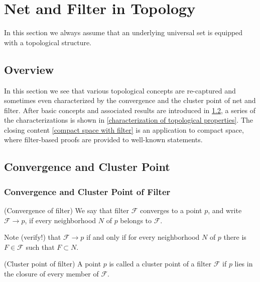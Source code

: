 \documentclass{report}
\begin{document}
\section{Net and Filter in Topology} \label{in topology}

In this section we always assume that an underlying universal set is equipped with a topological structure.

\subsection{Overview}
In this section we see that various topological concepts are re-captured and sometimes even characterized by the convergence and the cluster point of net and filter. After basic concepts  and associated results are introduced in \ref{convergence and cluster point}, a series of the characterizations is shown in \ref{characterization of topological properties}. The closing content \ref{compact space with filter} is an application to compact space, where filter-based proofs are provided to well-known statements.

\subsection{Convergence and Cluster Point} \label{convergence and cluster point}
\subsubsection{Convergence and Cluster Point of Filter}

\begin{dfn} (Convergence of filter)
    We say that filter \( \mathscr{F} \) converges to a point \( p \), and write \( \mathscr{F} \to p \), if every neighborhood \( N \) of \( p \) belongs to \( \mathscr{F} \).
\end{dfn}

\begin{rem}\label{rem filter convergence}
    Note (verify!) that \( \mathscr{F} \to p \) if and only if for every neighborhood \( N \) of \( p \) there is \( F \in \mathscr{F} \) such that \( F \subset N \).
\end{rem}

\begin{dfn} (Cluster point of filter)
    A point \( p \) is called a cluster point of a filter \( \mathscr{F} \) if \( p \) lies in the closure of every member of \( \mathscr{F} \).
\end{dfn}
\end{document}
